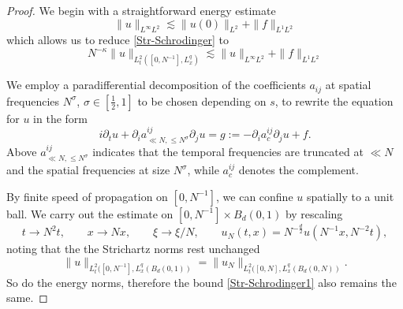 \documentclass{amsart}
\theoremstyle{definition}
\begin{document}
\begin{proof}
We begin with a straightforward energy estimate
\[
\|u\|_{L^\infty L^2} \lesssim \| u(0) \|_{L^2} + \| f \|_{L^1 L^2}
\]
which allows us to reduce \eqref{Str-Schrodinger} to 
\begin{equation}\label{Str-Schrodinger1}
N^{-\kappa} \| u \|_{L_t^2([0,N^{-1}],L^q_x)} \lesssim \| u \|_{L^\infty L^2} + \| f \|_{L^1 L^2}
\end{equation}

We employ a paradifferential decomposition of the coefficients $a_{ij}$ at spatial frequencies $N^{\sigma}$, $\sigma \in [\frac12,1]$ to be chosen depending on $s$, to 
rewrite the equation for $u$ in the form
\begin{equation*}
i \partial_t u + \partial_i a^{ij}_{\ll N, \leq N^{\sigma}} \partial_j u = g:= - \partial_i a^{ij}_{c} \partial_j u + f.
\end{equation*}
Above $a^{ij}_{\ll N, \leq N^{\sigma}}$ indicates that the temporal frequencies are truncated at $\ll N$ and the spatial frequencies at size $N^{\sigma}$, while $a^{ij}_c$ denotes the complement.

By finite speed of propagation on $[0,N^{-1}]$, we can confine $u$ spatially to a unit ball. We carry out the estimate on $[0,N^{-1}] \times B_d(0,1)$ by rescaling 
\[
t \to N^2 t, \qquad x \to Nx, \qquad \xi \to \xi/N, \qquad
u_N(t,x) = N^{-\frac{d}2} u(N^{-1} x,N^{-2} t),
\]
noting that the the Strichartz norms rest unchanged
\begin{equation*}
\| u \|_{L_t^2([0,N^{-1}],L^q_x(B_{d}(0,1))}  =  \| u_N \|_{L_t^2([0,N],L^q_x(B_d(0,N))}.
\end{equation*}
So do the energy norms, therefore the bound \eqref{Str-Schrodinger1} also remains the same.


\end{proof}
\end{document}
